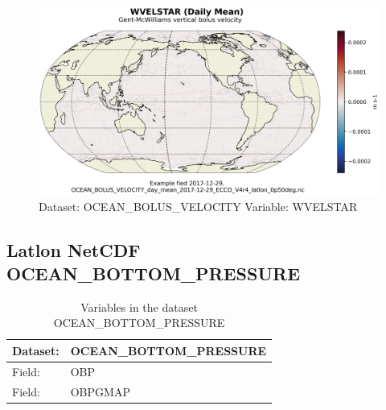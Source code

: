 \begin{figure}[H]
\centering
\includegraphics[scale=0.55]{../images/plots/latlon_plots/Gent-McWilliams_Ocean_Bolus_Velocity/WVELSTAR.png}
\caption{Dataset: OCEAN\_BOLUS\_VELOCITY Variable: WVELSTAR}
\label{tab:table-OCEAN_BOLUS_VELOCITY_WVELSTAR-Plot}
\end{figure}
\pagebreak
\subsection{Latlon NetCDF OCEAN\_BOTTOM\_PRESSURE}
\newp
\begin{longtable}{|p{}|p{}|}
\caption{Variables in the dataset OCEAN\_BOTTOM\_PRESSURE}
\label{tab:table-OCEAN_BOTTOM_PRESSURE-fields} \\ 
\hline \endhead \hline \endfoot
\rowcolor{lightgray} \textbf{Dataset:} & \textbf{OCEAN\_BOTTOM\_PRESSURE} \\ \hline
Field: &OBP \\ \hline
Field: &OBPGMAP \\ \hline
\end{longtable}

\pagebreak
